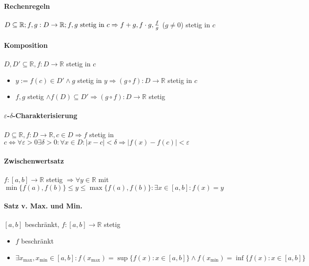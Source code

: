 \documentclass[paper=a3,paper=landscape, fontsize=9pt, DIV=30]{scrartcl}
\newcommand{\real}{{\mathbb{R}}}
\begin{document}
\begin{multicols*}{4}
  \paragraph{Rechenregeln}
  $D \subseteq \real;f,g: D \rightarrow \real;f,g ~\text{stetig in}\ c \\ \Rightarrow f+g, f \cdot g,\frac{f}{g}$ ($g \neq 0$) stetig in $c$


  \paragraph{Komposition}
  $D,D' \subseteq \real, f:D \rightarrow \real$ stetig in $c$
  \begin{itemize}
  \item $y := f(c) \in D' \wedge g $ stetig in $y \Rightarrow (g \circ f): D \rightarrow \real$ stetig in $c$
  \item $f,g$ stetig $\wedge f(D) \subseteq D' \Rightarrow (g \circ f): D \rightarrow \real$ stetig
  \end{itemize}


  \paragraph{$\varepsilon$-$\delta$-Charakterisierung}
  $D \subseteq \real, f: D \rightarrow \real, c \in D \Rightarrow f$ stetig in $c \Leftrightarrow \forall \varepsilon > 0 \exists \delta > 0: \forall x \in D: \lvert x - c \rvert < \delta \Rightarrow \lvert f(x)-f(c)\rvert < \varepsilon$


  \paragraph{Zwischenwertsatz}
  $f:[a,b] \rightarrow \real$ stetig $\Rightarrow \forall y \in \real$ mit $ \min\{f(a),f(b)\} \leq y \leq \max\{f(a), f(b)\}: \exists x \in [a,b]: f(x)=y$


  \paragraph{Satz v. Max. und Min.}
  $[a,b]$ beschränkt, $f: [a,b] \rightarrow \real$ stetig
  \begin{itemize}
  \item $f$ beschränkt
  \item $\exists x_{\max}, x_{\min} \in [a,b]: f(x_{\max})=\sup\{f(x): x \in [a,b]\} \wedge f(x_{\min})=\inf\{f(x):x \in [a,b]\}$
  \end{itemize}


\end{multicols*}
\end{document}
